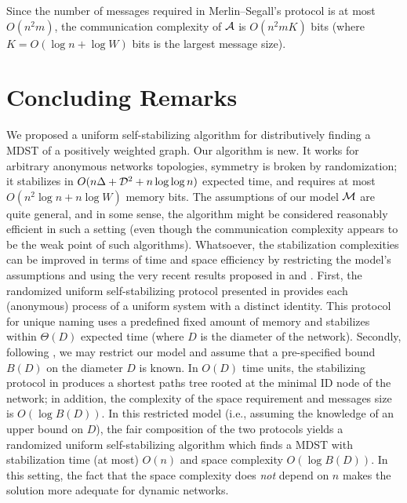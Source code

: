 \documentclass[10pt]{article}
\begin{document}
Since the number of messages required in Merlin--Segall's protocol is
at most $O(n^2m)$, the communication complexity of $\cal A$ is
$O(n^2mK)$ bits (where $K=O(\log n +\log W)$ bits is the largest
message size).

\section{Concluding Remarks}\label{concl}
We proposed a uniform self-stabilizing algorithm for distributively
finding a MDST of a positively weighted graph. Our algorithm is new.
It works for arbitrary anonymous networks topologies, symmetry is
broken by randomization; it stabilizes in $O(n\Delta + {\cal D}^2 + n
\log\log n)$ expected time, and requires at most $O(n^2\log n + n\log
W)$ memory bits. The assumptions of our model $\cal M$ are quite
general, and in some sense, the algorithm might be considered
reasonably efficient in such a setting (even though the communication
complexity appears to be the weak point of such algorithms).
Whatsoever, the stabilization complexities can be improved in terms
of time and space efficiency by restricting the model's assumptions
and using the very recent results proposed in \cite{Dole94} and
\cite{AKMP+93}. First, the randomized uniform self-stabilizing
protocol presented in \cite{Dole94} provides each (anonymous) process
of a uniform system with a distinct identity. This protocol for unique
naming uses a predefined fixed amount of memory and stabilizes within
$\Theta(D)$ expected time (where $D$ is the diameter of the network).
Secondly, following \cite{AKMP+93}, we may restrict our model and assume
that a pre-specified bound $B(D)$ on the diameter $D$ is known.
In $O(D)$ time units, the stabilizing protocol in \cite{AKMP+93} produces
a shortest paths tree rooted at the minimal ID node of the network;
in addition, the complexity of the space requirement and messages size
is $O(\log B(D))$. In this restricted model (i.e., assuming the knowledge
of an upper bound on $D$), the fair composition of the two protocols yields
a randomized uniform self-stabilizing algorithm which finds a MDST with
stabilization time (at most) $O(n)$ and space complexity $O(\log B(D))$. 
In this setting, the fact that the space complexity does {\em not}
depend on $n$ makes the solution more adequate for dynamic networks.
\end{document}
